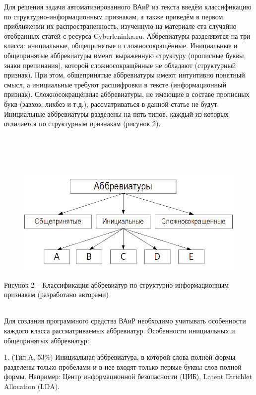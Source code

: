 \documentclass[12pt]{article}
\begin{document}
\indent Для решения задачи автоматизированного ВАиР из текста введём классификацию по структурно-информационным признакам, а также приведём в первом приближении их распространенность, изученную на материале ста случайно отобранных статей с ресурса Cyberleninka.ru. Аббревиатуры разделяются на три класса: инициальные, общепринятые и сложносокращённые. Инициальные и общепринятые аббревиатуры имеют выраженную структуру (прописные буквы, знаки препинания), которой сложносокращённые не обладают (структурный признак). При этом, общепринятые аббревиатуры имеют интуитивно понятный смысл, а инициальные требуют расшифровки в тексте (информационный признак). Сложносокращённые аббревиатуры, не имеющие в составе прописных букв (завхоз, ликбез и т.д.), рассматриваться в данной статье не будут. Инициальные аббревиатуры разделены на пять типов, каждый из которых отличается по структурным признакам (рисунок 2). 
\indent \\
\indent \\
\indent \\
\indent \\
\indent \\
\begin{figure}[h!]
    \centering
    \includegraphics[width=\linewidth]{image2.png}
    \label{fig:enter-label}
\end{figure}

\begin{center}
    {Рисунок 2 – Классификация аббревиатур по структурно-информационным признакам (разработано авторами)} 
\end{center} \\

\indent Для создания программного средства ВАиР необходимо учитывать особенности каждого класса рассматриваемых аббревиатур.
Особенности инициальных и общепринятых аббревиатур:

    1. (Тип А, 53\%) Инициальная аббревиатура, в которой слова полной формы разделены только пробелами и в нее входят только первые буквы слов полной формы. Например: Центр информационной безопасности (ЦИБ), Latent Dirichlet Allocation (LDA).
\end{document}
